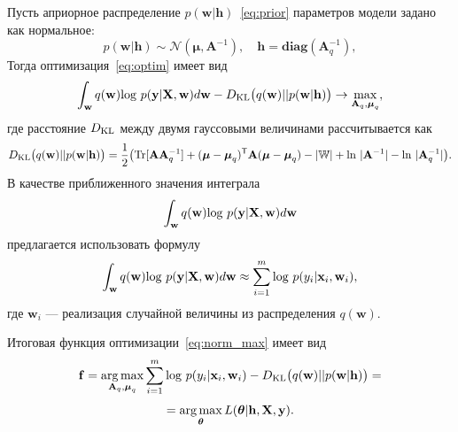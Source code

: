 Пусть априорное распределение $p(\mathbf{w}|\mathbf{h})$~\eqref{eq:prior} параметров модели задано как нормальное:
\[
	p(\mathbf{w}|\mathbf{h}) \sim \mathcal{N}(\boldsymbol{\mu}, \mathbf{A}^{-1}),\quad \mathbf{h} = \textbf{diag}(\mathbf{A}^{-1}_q),
\] 
Тогда оптимизация~\eqref{eq:optim} имеет вид
\begin{equation}
\label{eq:norm_max}
 \int_{\mathbf{w}} q(\mathbf{w})\textnormal{log}~{p(\mathbf{y}|\mathbf{X},\mathbf{w})} d \mathbf{w} - D_\textnormal{KL}\bigl(q (\mathbf{w} )|| p (\mathbf{w}|\mathbf{h})\bigr) \to \max_{\mathbf{A}_q, \boldsymbol{\mu}_q},
\end{equation}
где расстояние $D_\textnormal{KL}$ между двумя гауссовыми величинами рассчитывается как 
\[
	D_\textnormal{KL}\bigl(q (\mathbf{w}) || p (\mathbf{w}|\mathbf{h})\bigr) = \frac{1}{2} \bigl( \textnormal{Tr} [\mathbf{A}\mathbf{A}^{-1}_q] + (\boldsymbol{\mu} - \boldsymbol{\mu}_q)^\mathsf{T}\mathbf{A}(\boldsymbol{\mu} - \boldsymbol{\mu}_q) - |\mathbb{W}| +\textnormal{ln}~|\mathbf{A}^{-1}| - \textnormal{ln}~|\mathbf{A}_q^{-1}| \bigr).
\]
В качестве приближенного значения интеграла $$\int_{\mathbf{w}} q(\mathbf{w})\textnormal{log}~{p(\mathbf{y}|\mathbf{X},\mathbf{w})} d \mathbf{w}$$ предлагается использовать формулу
\[
\int_{\mathbf{w}} q(\mathbf{w})\textnormal{log}~{p(\mathbf{y}|\mathbf{X},\mathbf{w})} d \mathbf{w} \approx \sum_{i=1}^m \textnormal{log}~p({y}_i|\mathbf{x}_i, \mathbf{w}_i),
\]
где $\mathbf{w}_i$  --- реализация случайной величины из распределения $q(\mathbf{w})$.

Итоговая функция оптимизации~\eqref{eq:norm_max} имеет вид
\begin{equation}
\label{eq:gaus}
	\mathbf{f} = \operatorname*{arg\,max}_{\mathbf{A}_q, \boldsymbol{\mu}_q} \sum_{i=1}^m \textnormal{log}~p({y}_i|\mathbf{x}_i, \mathbf{w}_i) - D_\textnormal{KL}\bigl(q (\mathbf{w} )|| p (\mathbf{w}|\mathbf{h})\bigr) =
\end{equation}
\[
   = \operatorname*{arg\,max}_{\boldsymbol{\theta}} L( \boldsymbol{\theta}| \mathbf{h}, \mathbf{X}, \mathbf{y}).
\]

